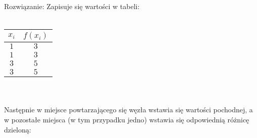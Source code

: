 \documentclass[main.tex]{subfiles}
\begin{document}
    Rozwiązanie:
    Zapisuje się wartości w tabeli:\\\\
    \begin{tabular}{|c|c|}
        \hline
        $x_i$ & $f(x_i)$ \\ \hline
        $1$ & $3$ \\ \hline
        $1$ & $3$ \\ \hline
        $3$ & $5$ \\ \hline
        $3$ & $5$ \\ \hline
    \end{tabular}\\\\
    Następnie w miejsce powtarzającego się węzła wstawia się wartości pochodnej, a w pozostałe miejsca (w tym przypadku jedno) wstawia się odpowiednią różnicę dzieloną:\\\\
\end{document}
